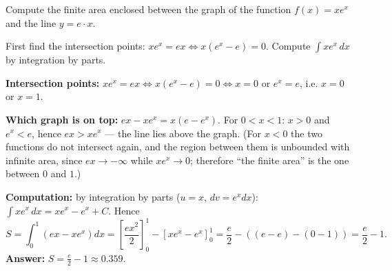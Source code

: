 
\begin{question}
Compute the finite area enclosed between the graph of the function $f(x) = xe^x$ and the line $y = e\cdot x$.
\end{question}

\begin{hint}
First find the intersection points: $xe^x = ex \iff x(e^x - e) = 0$. Compute $\int xe^x\,dx$ by integration by parts.
\end{hint}

\begin{solution}
\textbf{Intersection points:} $xe^x = ex \iff x(e^x - e) = 0 \iff x = 0$ or $e^x = e$, i.e. $x = 0$ or $x = 1$.

\textbf{Which graph is on top:} $ex - xe^x = x(e - e^x)$. For $0 < x < 1$: $x > 0$ and $e^x < e$, hence $ex > xe^x$ --- the line lies above the graph.
(For $x < 0$ the two functions do not intersect again, and the region between them is unbounded with infinite area, since $ex \to -\infty$ while $xe^x \to 0$; therefore ``the finite area'' is the one between $0$ and $1$.)

\textbf{Computation:} by integration by parts ($u = x$, $dv = e^xdx$): $\int xe^x\,dx = xe^x - e^x + C$. Hence
\[ S = \int_0^1\left(ex - xe^x\right)dx = \left[\frac{ex^2}{2}\right]_0^1 - \left[xe^x - e^x\right]_0^1 = \frac e2 - \left((e - e) - (0 - 1)\right) = \frac e2 - 1. \]
\textbf{Answer:} $S = \frac e2 - 1 \approx 0.359$.
\end{solution}
